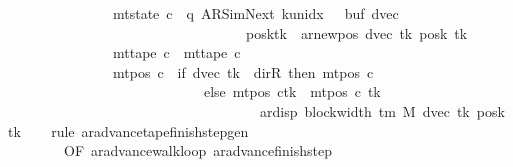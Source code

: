 \begin{isabellebody}
\ \ \ \ \ \ \ \ \ \ \ \ \ \ {\isasymand}\ mt{\isacharunderscore}{\kern0pt}state\ c{\isacharprime}{\kern0pt}\ {\isacharequal}{\kern0pt}\ {\isacharparenleft}{\kern0pt}q{\isacharcomma}{\kern0pt}\ AR{\isacharunderscore}{\kern0pt}SimNext{\isacharcomma}{\kern0pt}\ k{\isacharunderscore}{\kern0pt}unidx\ {}{\isacharcomma}{\kern0pt}\ {}{\isacharcomma}{\kern0pt}\ buf{\isacharcomma}{\kern0pt}\ dvec{\isacharcomma}{\kern0pt}\isanewline
\ \ \ \ \ \ \ \ \ \ \ \ \ \ \ \ \ \ \ \ \ \ \ \ \ \ \ \ \ \ \ \ \ \ posk{\isacharparenleft}{\kern0pt}tk\ {\isacharcolon}{\kern0pt}{\isacharequal}{\kern0pt}\ ar{\isacharunderscore}{\kern0pt}newpos\ {\isacharparenleft}{\kern0pt}dvec\ tk{\isacharparenright}{\kern0pt}\ {\isacharparenleft}{\kern0pt}posk\ tk{\isacharparenright}{\kern0pt}{\isacharparenright}{\kern0pt}{\isacharparenright}{\kern0pt}\isanewline
\ \ \ \ \ \ \ \ \ \ \ \ \ \ {\isasymand}\ mt{\isacharunderscore}{\kern0pt}tape\ c{\isacharprime}{\kern0pt}\ {\isacharequal}{\kern0pt}\ mt{\isacharunderscore}{\kern0pt}tape\ c{}\isanewline
\ \ \ \ \ \ \ \ \ \ \ \ \ \ {\isasymand}\ mt{\isacharunderscore}{\kern0pt}pos\ c{\isacharprime}{\kern0pt}\ {\isacharequal}{\kern0pt}\ {\isacharparenleft}{\kern0pt}if\ dvec\ tk\ {\isacharequal}{\kern0pt}\ dir{\isachardot}{\kern0pt}R\ then\ mt{\isacharunderscore}{\kern0pt}pos\ c{}\isanewline
\ \ \ \ \ \ \ \ \ \ \ \ \ \ \ \ \ \ \ \ \ \ \ \ \ \ \ \ else\ {\isacharparenleft}{\kern0pt}mt{\isacharunderscore}{\kern0pt}pos\ c{}{\isacharparenright}{\kern0pt}{\isacharparenleft}{\kern0pt}tk\ {\isacharcolon}{\kern0pt}{\isacharequal}{\kern0pt}\ mt{\isacharunderscore}{\kern0pt}pos\ c{}\ tk\isanewline
\ \ \ \ \ \ \ \ \ \ \ \ \ \ \ \ \ \ \ \ \ \ \ \ \ \ \ \ \ \ \ \ \ \ \ {\isacharminus}{\kern0pt}\ ar{\isacharunderscore}{\kern0pt}disp\ {\isacharparenleft}{\kern0pt}block{\isacharunderscore}{\kern0pt}width\ {\isacharparenleft}{\kern0pt}{\isasymGamma}{\isacharunderscore}{\kern0pt}tm\ M{\isacharparenright}{\kern0pt}{\isacharparenright}{\kern0pt}\ {\isacharparenleft}{\kern0pt}dvec\ tk{\isacharparenright}{\kern0pt}\ {\isacharparenleft}{\kern0pt}posk\ tk{\isacharparenright}{\kern0pt}{\isacharparenright}{\kern0pt}{\isacharparenright}{\kern0pt}{\isachardoublequoteclose}\isanewline
%
\isadelimproof
\ \ %
\endisadelimproof
%
\isatagproof
{}\isamarkupfalse%
\ {\isacharparenleft}{\kern0pt}rule\ ar{\isacharunderscore}{\kern0pt}advance{\isacharunderscore}{\kern0pt}tape{\isacharunderscore}{\kern0pt}finish{\isacharunderscore}{\kern0pt}step{\isacharunderscore}{\kern0pt}gen\isanewline
\ \ \ \ \ \ \ \ {\isacharbrackleft}{\kern0pt}OF\ ar{\isacharunderscore}{\kern0pt}advance{\isacharunderscore}{\kern0pt}walk{\isacharunderscore}{\kern0pt}loop\ ar{\isacharunderscore}{\kern0pt}advance{\isacharunderscore}{\kern0pt}finish{\isacharunderscore}{\kern0pt}step\isanewline

\end{isabellebody}
